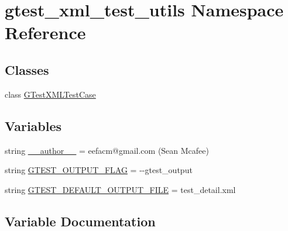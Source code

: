 \hypertarget{namespacegtest__xml__test__utils}{}\section{gtest\+\_\+xml\+\_\+test\+\_\+utils Namespace Reference}
\label{namespacegtest__xml__test__utils}
\subsection*{Classes}
\begin{DoxyCompactItemize}
\item 
class \hyperlink{classgtest__xml__test__utils_1_1_g_test_x_m_l_test_case}{G\+Test\+X\+M\+L\+Test\+Case}
\end{DoxyCompactItemize}
\subsection*{Variables}
\begin{DoxyCompactItemize}
\item 
string \hyperlink{namespacegtest__xml__test__utils_a75e1d6c9e5adaa9add821907994e1a40}{\+\_\+\+\_\+author\+\_\+\+\_\+} = \textquotesingle{}eefacm@gmail.\+com (Sean Mcafee)\textquotesingle{}
\item 
string \hyperlink{namespacegtest__xml__test__utils_aa354c3ca453d90f496f4cbc576406fb2}{G\+T\+E\+S\+T\+\_\+\+O\+U\+T\+P\+U\+T\+\_\+\+F\+L\+A\+G} = \textquotesingle{}-\/-\/gtest\+\_\+output\textquotesingle{}
\item 
string \hyperlink{namespacegtest__xml__test__utils_aebe969ed368778716d0619214ff7b853}{G\+T\+E\+S\+T\+\_\+\+D\+E\+F\+A\+U\+L\+T\+\_\+\+O\+U\+T\+P\+U\+T\+\_\+\+F\+I\+L\+E} = \textquotesingle{}test\+\_\+detail.\+xml\textquotesingle{}
\end{DoxyCompactItemize}


\subsection{Variable Documentation}
\hypertarget{namespacegtest__xml__test__utils_a75e1d6c9e5adaa9add821907994e1a40}{}
